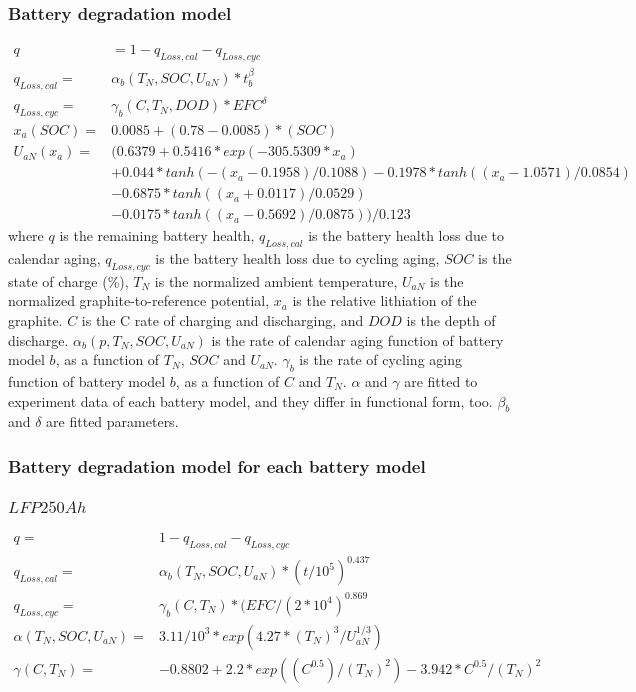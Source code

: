 \documentclass[11pt,preprint]{elsarticle}
\begin{document}
\subsubsection{Battery degradation model}
\begin{align}
    q& = 1- q_{Loss,cal} - q_{Loss,cyc}\\
    q_{Loss,cal} =& \alpha_b(T_N,SOC,U_{aN}) * t^\beta_b\\
    q_{Loss,cyc} =& \gamma_b(C,T_N,DOD) * EFC^\delta\\
    x_a(SOC) =& 0.0085 + (0.78-0.0085)*(SOC)\\
    U_{aN}(x_a) =& (0.6379 + 0.5416 * exp(-305.5309*x_a) \\
    &+ 0.044* tanh(-(x_a-0.1958)/0.1088) - 0.1978*tanh((x_a-1.0571)/0.0854)\\
                &-0.6875* tanh((x_a+0.0117)/0.0529) \\
                &- 0.0175*tanh((x_a-0.5692)/0.0875)) / 0.123
\end{align}
\newline
where $q$ is the remaining battery health, $q_{Loss,cal}$ is the battery health loss due to calendar aging, $q_{Loss,cyc}$ is the battery health loss due to cycling aging, $SOC$ is the state of charge (\%), $T_N$ is the normalized ambient temperature, $U_{aN}$ is the normalized graphite-to-reference potential, $x_a$ is the relative lithiation of the graphite. $C$ is the C rate of charging and discharging, and $DOD$ is the depth of discharge. $\alpha_b(p,T_N,SOC,U_{aN})$ is the rate of calendar aging function of battery model $b$, as a function of $T_N$, $SOC$ and $U_{aN}$. $\gamma_b$ is the rate of cycling aging function of battery model $b$, as a function of $C$ and $T_N$. $\alpha$ and $\gamma$ are fitted to experiment data of each battery model, and they differ in functional form, too. $\beta_b$ and $\delta$ are fitted parameters. 
\newline

\subsubsection{Battery degradation model for each battery model} 
\subsubsection{$LFP250Ah$}
\begin{align}
    q =& 1- q_{Loss,cal} - q_{Loss,cyc}\\
    q_{Loss,cal} =& \alpha_b(T_N,SOC,U_{aN}) * (t/10^5)^0.437\\
    q_{Loss,cyc} =& \gamma_b(C,T_N) * (EFC/(2*10^4)^0.869\\
    \alpha(T_N,SOC,U_{aN}) =& 3.11/10^3 * exp(4.27* (T_N)^3/ U_{aN}^{1/3})\\
    \gamma(C,T_N) =& -0.8802 + 2.2 * exp((C^0.5)/(T_N)^2) -3.942 * C^0.5/(T_N)^2\\
\end{align}
\end{document}
